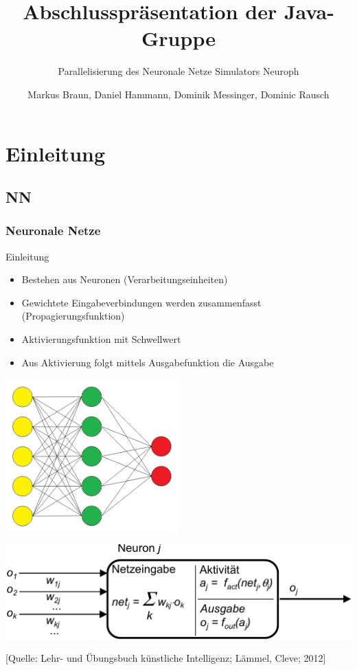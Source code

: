\documentclass[18pt]{beamer}
\title[Paralellisierung neuronaler Netze]{Abschlusspräsentation der Java-Gruppe}
\subtitle{Parallelisierung des Neuronale Netze Simulators Neuroph}
\author[M. Braun, D. Hammann, D. Messinger, D. Rausch]{Markus Braun, Daniel Hammann, Dominik Messinger, Dominic Rausch}
\institute{Institut für Programmstrukturen und Datenorganisation (IPD), Lehrstuhl für Programmiersysteme}
\begin{document}
	\maketitle
	
	\section{Einleitung}
	\subsection{NN}
	\begin{frame}[c]\frametitle{Neuronale Netze}
		\begin{block}{Einleitung}
		    \begin{itemize}
			    \item Bestehen aus Neuronen (Verarbeitungseinheiten)
		    	\item Gewichtete Eingabeverbindungen werden zusammenfasst (Propagierungsfunktion)
		    	\item Aktivierungsfunktion mit Schwellwert
		    	\item Aus Aktivierung folgt mittels Ausgabefunktion die Ausgabe
		    \end{itemize}		    
		\end{block}	
		\vspace{.5cm}
		\begin{minipage}[c]{0.48\textwidth}
			\begin{center}
			\includegraphics[width=0.5\textwidth]{images/ann.png}
			\end{center}
		\end{minipage}	
		\begin{minipage}[c]{0.48\textwidth}
			\begin{center}
			\includegraphics[width=\textwidth]{images/Neuron}
			\end{center}				
		\end{minipage}
		\begin{flushright}
			\tiny{[Quelle: Lehr- und Übungsbuch künstliche Intelligenz; Lämmel, Cleve; 2012]}
		\end{flushright}
	\end{frame}
\end{document}
